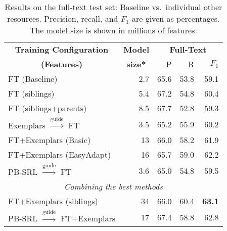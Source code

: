 
\setlength\tabcolsep{5pt}

\begin{table}\centering\small
\def\arraystretch{1}
\begin{tabular}{lr<{\hspace*{5pt}}rrr}%
\toprule
\multicolumn{1}{c}{\textbf{Training Configuration}} 
& \multicolumn{1}{c}{\textbf{Model}} 
& \multicolumn{3}{c}{\textbf{Full-Text}} \\ %
\cline{3-5}%
 \multicolumn{1}{c}{\textbf{(Features)}} 
& \multicolumn{1}{c}{\textbf{size*}} 
& P & R & $F_1$ \\
\midrule
FT (Baseline) & 2.7 & 65.6 & 53.8 & 59.1 \\ %
\midrule
FT (siblings) & 5.4 & 67.2 & 54.8 & 60.4 \\
FT (siblings+parents) & 8.5 & 67.7 & 52.8 & 59.3 \\
\midrule
Exemplars $\xrightarrow{\text{guide}}$ FT & 3.5 & 65.2 & 55.9 & 60.2 \\
FT+Exemplars (Basic) & 13\nss{.?} & 66.0 & 58.2 & 61.9 \\
FT+Exemplars (EasyAdapt) & 16\nss{.?} & 65.7 & 59.0 & 62.2 \\
\midrule
PB-SRL $\xrightarrow{\text{guide}}$ FT & 3.6 & 65.0 & 54.8 & 59.5 \\
\midrule
\multicolumn{5}{c}{\em{Combining the best methods}}\\
\midrule
FT+Exemplars (siblings) & 34 & 66.0 & 60.4 & \textbf{63.1} \\
PB-SRL $\xrightarrow{\text{guide}}$ FT+Exemplars & 17 & 67.4 & 58.8 & 62.8 \\
\bottomrule
\end{tabular}
\caption{Results on the full-text test set:
Baseline vs.~individual other resources.
Precision, recall, and $F_1$ are given as percentages. The model size is shown in millions of features.}
\label{tbl:results}
\end{table}

